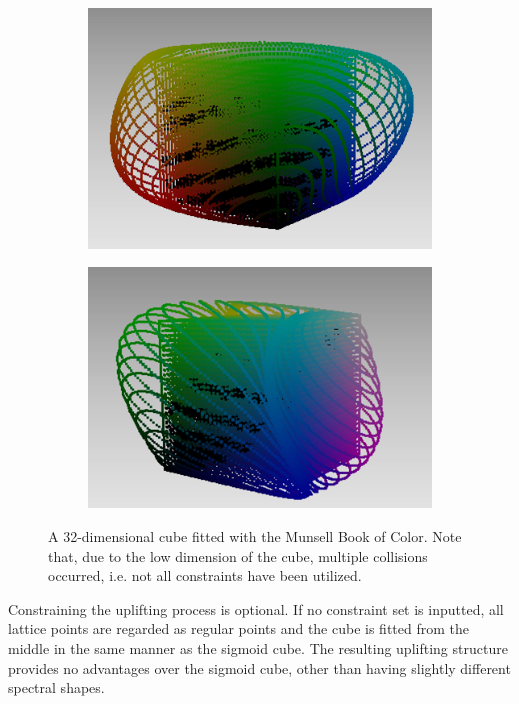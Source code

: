 \begin{figure}[t!]
\begin{subfigure}[t]{0.22\textwidth}
		\includegraphics[width=\linewidth]{img/seededCube_mcb3.png}
		\label{fig:seededCube_mcb3}
	\end{subfigure} \hspace{0.05em}
	\begin{subfigure}[t]{0.22\textwidth}
		\includegraphics[width=\linewidth]{img/seededCube_mcb4.png}
		\label{fig:seededCube_mcb4}
	\end{subfigure}
	\caption{A 32-dimensional cube fitted with the Munsell Book of Color. Note that, due to the low dimension of the cube, multiple collisions occurred, i.e. not all constraints have been utilized.}
	\label{fig:seededCubeMCB}
\end{figure}

Constraining the uplifting process is optional. If no constraint set is inputted, all lattice points are regarded as regular points and the cube is fitted from the middle in the same manner as the sigmoid cube. The resulting uplifting structure provides no advantages over the sigmoid cube, other than having slightly different spectral shapes.

